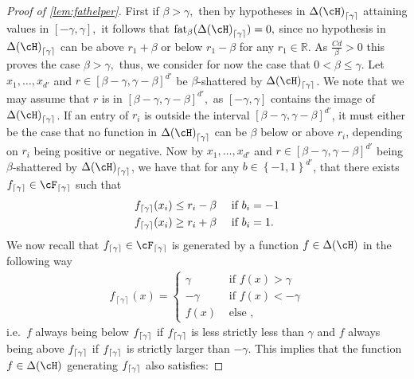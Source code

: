 \begin{proof}[Proof of \cref{lem:fathelper}]
    First if $ \beta>\gamma,$ then by hypotheses in $ \dlh_{\left\lceil\gamma \right\rceil} $ attaining values in $ [-\gamma,\gamma],$ it follows that $ \fat_{\beta}(\dlh_{\left\lceil\gamma \right\rceil} )=0,$ since no hypothesis in $ \dlh_{\left\lceil\gamma \right\rceil} $ can be above $ r_{1}+\beta $  or below $r_{1}-\beta  $ for any $ r_{1}\in\mathbb{R}.$ As $ \frac{Cd}{\beta}>0 $ this proves the case $ \beta>\gamma,$ thus, we consider for now the case that $ 0<\beta\leq \gamma. $      
    Let $ x_1,\ldots,x_{d'} $ and $ r\in [\beta-\gamma,\gamma-\beta]^{d'} $ be $ \beta $-shattered by $ \dlh_{\left\lceil\gamma\right\rceil} $. We note that we may assume that $ r $ is in  $ [\beta-\gamma,\gamma-\beta]^{d'}, $ as $ [-\gamma,\gamma] $  contains the image of $ \dlh_{\left\lceil\gamma \right\rceil} $. If an entry of $ r_{i} $ is outside the interval $ [\beta-\gamma,\gamma-\beta]^{d'} $, it must either be the case that no function in $ \dlh_{\left\lceil\gamma \right\rceil} $ can be $ \beta $ below or above  $ r_{i} $, depending on $ r_{i} $ being positive or negative. Now by $ x_1,\ldots,x_{d'} $ and $ r\in [\beta-\gamma,\gamma-\beta]^{d'} $ being $ \beta $-shattered by $ \dlh_{\left\lceil\gamma\right\rceil} $, we have that for any $ b\in \left\{ -1,1 \right\}^{d'}  $, that there exists $ \cffs\in\cff  $  such that  
    \begin{align}
      f_{\left\lceil\gamma\right\rceil}(x_i)&\leq r_{i}-\beta  \quad \text{ if  } b_{i}=-1
      \\
      f_{\left\lceil\gamma\right\rceil}(x_i)&\geq r_{i}+\beta  \quad \text{ if  } b_{i}=1.
    \end{align}
    We now recall that $ \cffs\in \cff $ is generated by a function $ f\in \dlh $ in the following way
    \begin{align*}
            f_{\left\lceil\gamma\right\rceil}(x)=\begin{cases}
                \gamma &\text{ if }f(x)> \gamma
                \\
                -\gamma &\text{ if } f(x)<- \gamma
                \\
                f(x) &\text{ else },
            \end{cases}
    \end{align*} 
    i.e.\ $ f $ always being below $ f_{\left\lceil\gamma\right\rceil} $ if $ f_{\left\lceil\gamma\right\rceil} $ is less strictly less than $ \gamma $  and $ f $ always being above $ f_{\left\lceil\gamma\right\rceil} $ if $ f_{\left\lceil\gamma\right\rceil} $ is strictly larger than $ -\gamma $.    
    This implies that the function $ f\in \dlh $ generating $ f_{\left\lceil\gamma\right\rceil} $   also satisfies:  

\end{proof}
